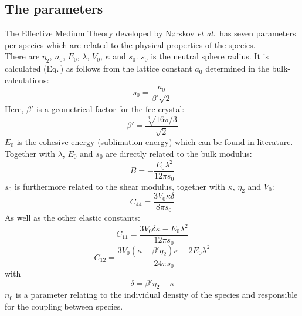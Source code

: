 \documentclass[twoside, 11pt, titlepage, captions=nooneline, a4paper, headsepline]{scrbook}%
\newcommand{\9}{\mathrm}
\newcommand{\0}{\,\mathrm}
\begin{document}
\subsection{The parameters}
The Effective Medium Theory developed by N\o rskov \emph{et al.}\,\cite{jacobsen1996,jacobsen1987} has seven parameters per species which are related to the physical properties of the species.\\
There are $\eta_2$, $n_0$, $E_0$, $\lambda$, $V_0$, $\kappa$ and $s_0$.
$s_0$ is the neutral sphere radius. It is calculated (Eq.\,) as follows from the lattice constant $a_0$ determined in the bulk-calculations:
\begin{equation}
s_0 = \frac{a_0}{\beta' \sqrt{2}}
\end{equation}
Here, $\beta'$ is a geometrical factor for the fcc-crystal:
\begin{equation}
\beta' = \frac{\sqrt[3]{16 \pi /3}}{\sqrt{2}}
\end{equation}
$E_0$ is the cohesive energy (sublimation energy) which can be found in literature. 
Together with $\lambda$, $E_0$ and $s_0$ are directly related to the bulk modulus:\\
\begin{equation}
B = -\frac{E_0 \lambda^2}{12 \pi s_0}
\end{equation}
$s_0$ is furthermore related to the shear modulus, together with $\kappa$, $\eta_2$ and $V_0$:\\
\begin{equation}
C_{44} = \frac{3 V_0 \kappa \delta}{8\pi s_0}
\label{c44}
\end{equation}
As well as the other elastic constants:
\begin{equation}
C_{11}=\frac{3 V_0 \delta \kappa -E_0 \lambda^2}{12 \pi s_0}
\end{equation}
\begin{equation}
C_{12}=\frac{3 V_0(\kappa-\beta'\eta_2)\kappa-2E_0\lambda^2}{24\pi s_0}
\end{equation}
with 
\begin{equation}
\delta = \beta'\eta_2-\kappa
\end{equation}
$n_0$ is a parameter relating to the individual density of the species and responsible for the coupling between species.\\
\end{document}
